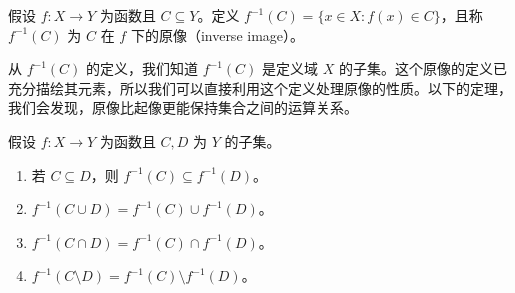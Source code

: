 \begin{definition}
假设 $f : X \to Y$ 为函数且 $C \subseteq Y$。定义 $f^{-1}(C) = \{x \in X : f(x) \in C\}$，且称 $f^{-1}(C)$ 为 $C$ 在 $f$ 下的原像（inverse image）。
\end{definition}

从 $f^{-1}(C)$ 的定义，我们知道 $f^{-1}(C)$ 是定义域 $X$ 的子集。这个原像的定义已充分描绘其元素，所以我们可以直接利用这个定义处理原像的性质。以下的定理，我们会发现，原像比起像更能保持集合之间的运算关系。

\begin{proposition}
假设 $f : X \to Y$ 为函数且 $C, D$ 为 $Y$ 的子集。
\begin{enumerate}
    \item 若 $C \subseteq D$，则 $f^{-1}(C) \subseteq f^{-1}(D)$。
    \item $f^{-1}(C \cup D) = f^{-1}(C) \cup f^{-1}(D)$。
    \item $f^{-1}(C \cap D) = f^{-1}(C) \cap f^{-1}(D)$。
    \item $f^{-1}(C \setminus D) = f^{-1}(C) \setminus f^{-1}(D)$。
\end{enumerate}
\end{proposition}

